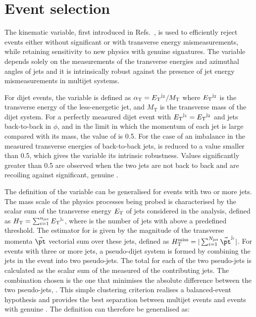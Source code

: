 \section{Event selection}
\label{sec:event_selection}

The \alphat kinematic variable, first introduced in
Refs.~\cite{Randall:2008rw, RA1Paper}, is used to efficiently reject
events either without significant \met or with transverse energy
mismeasurements, while retaining sensitivity to new physics with
genuine \met signatures. The variable \alphat depends solely on the
measurements of the transverse energies and azimuthal angles of jets
and it is intrinsically robust against the presence of jet energy
mismeasurements in multijet systems.

For dijet events, the \alphat variable is defined as $\alphat =
\Et^{\rm j_2}/M_\text{T}$ where $\Et^{\rm j_2}$ is the transverse
energy of the less-energetic jet, and $M_\text{T}$ is the transverse
mass of the dijet system. 
For a perfectly measured dijet event with $\Et^{\mathrm{j}_1} =
\Et^{\mathrm{j}_2}$ and jets back-to-back in $\phi$, and in the limit
in which the momentum of each jet is large compared with its mass, the
value of \alphat is 0.5. For the case of an imbalance in the measured
transverse energies of back-to-back jets, \alphat is reduced to a
value smaller than 0.5, which gives the variable its intrinsic
robustness. %
Values significantly greater than 0.5 are observed when the two jets
are not back to back and are recoiling against significant, genuine
\met.

The definition of the \alphat variable can be generalised for events
with two or more jets. The mass scale of the physics processes being
probed is characterised by the scalar sum of the transverse energy
$\Et$ of jets considered in the analysis, defined as $\scalht =
\sum_{i=1}^{\njet} \Et^{\mathrm{j}_i}$, where \njet is the number of
jets with \Et above a predefined threshold. The estimator for \met is
given by the magnitude of the transverse momenta $\vec{\pt}$ vectorial
sum over these jets, defined as $\mht = |\sum_{i=1}^{N_\text{jet}}
\vec{\pt}^{\mathrm{j}_i}|$.  For events with three or more jets, a
pseudo-dijet system is formed by combining the jets in the event into
two pseudo-jets. The total \Et for each of the two pseudo-jets is
calculated as the scalar sum of the measured \Et of the contributing
jets. The combination chosen is the one that minimises the absolute
\Et difference between the two pseudo-jets, \dht. This simple
clustering criterion realises a balanced-event hypothesis and provides
the best separation between multijet events and events with genuine
\met. The \alphat definition can therefore be generalised as:


